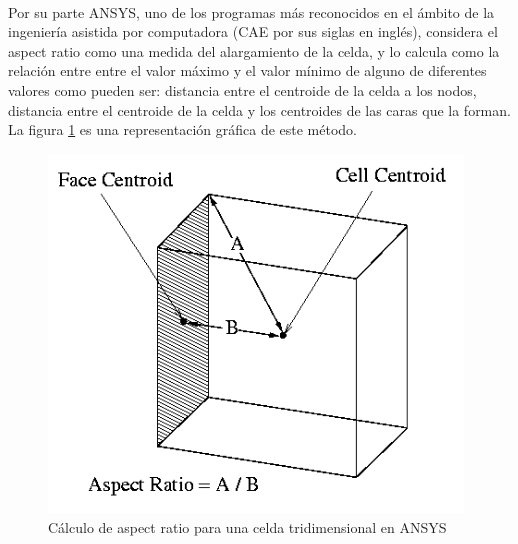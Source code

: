 \documentclass[letterpaper, openright, 12pt]{book}
\begin{document}
    \paragraph*{}
        Por su parte ANSYS, uno de los programas más reconocidos en el ámbito de
        la ingeniería asistida por computadora (CAE por sus siglas en inglés),
        considera el aspect ratio como una medida del alargamiento de la celda,
        y lo calcula como la relación entre entre el valor máximo y el valor
        mínimo de alguno de diferentes valores como pueden ser: distancia entre
        el centroide de la celda a los nodos, distancia entre el centroide de la
        celda y los centroides de las caras que la forman. La figura
        \ref{aspect_ansys} es una representación gráfica de este método.
        \begin{figure}[htbp!]
            \centering
            \includegraphics[keepaspectratio, width=110mm]{./Imagenes/aspect_ansys.png}
            \caption[Cálculo de aspect ratio en ANSYS]{Cálculo de aspect ratio
            para una celda tridimensional en ANSYS}
            \label{aspect_ansys}
        \end{figure}
\end{document}
